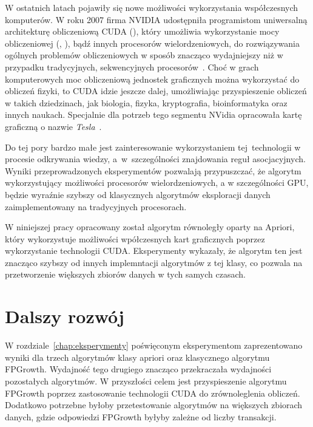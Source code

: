 W ostatnich latach pojawiły się nowe możliwości wykorzystania współczesnych komputerów. W roku 2007 firma NVIDIA udostępniła programistom uniwersalną architekturę obliczeniową CUDA (), który umożliwia wykorzystanie mocy obliczeniowej  (, ), bądź innych procesorów wielordzeniowych, do rozwiązywania ogólnych problemów obliczeniowych w sposób znacząco wydajniejszy niż w przypadku tradycyjnych, sekwencyjnych procesorów~\cite{cuda:zone}. Choć w grach komputerowych moc obliczeniową jednostek graficznych można wykorzystać do obliczeń fizyki, to CUDA idzie jeszcze dalej, umożliwiając przyspieszenie obliczeń w takich dziedzinach, jak biologia, fizyka, kryptografia, bioinformatyka oraz innych naukach. Specjalnie dla potrzeb tego segmentu NVidia opracowała kartę graficzną o nazwie \emph{Tesla}~\cite{cuda:tesla}.

Do tej pory bardzo małe jest zainteresowanie wykorzystaniem tej~technologii w procesie odkrywania wiedzy, a~w~szczególności znajdowania reguł asocjacyjnych. Wyniki przeprowadzonych eksperymentów pozwalają przypuszczać, że algorytm wykorzystujący możliwości procesorów wielordzeniowych, a w szczególności GPU, będzie wyraźnie szybszy od klasycznych algorytmów eksploracji danych zaimplementowany na tradycyjnych procesorach. 

W niniejszej pracy opracowany został algorytm równoległy oparty na Apriori, który wykorzystuje możliwości wpółczesnych kart graficznych poprzez wykorzystanie technologii CUDA. Eksperymenty wykazały, że algorytm ten jest znacząco szybszy od innych implemntacji algorytmów z tej klasy, co pozwala na przetworzenie większych zbiorów danych w tych samych czasach.

\section{Dalszy rozwój}

W rozdziale~\ref{chap:eksperymenty} poświęconym eksperymentom zaprezentowano wyniki dla trzech algorytmów klasy apriori oraz klasycznego algorytmu FPGrowth. Wydajność tego drugiego znacząco przekraczała wydajności pozostałych algorytmów. W przyszłości celem jest przyspieszenie algorytmu FPGrowth poprzez zastosowanie technologii CUDA do zrównoleglenia obliczeń. Dodatkowo potrzebne byłoby przetestowanie algorytmów na większych zbiorach danych, gdzie odpowiedzi FPGrowth byłyby zależne od liczby transakcji.
